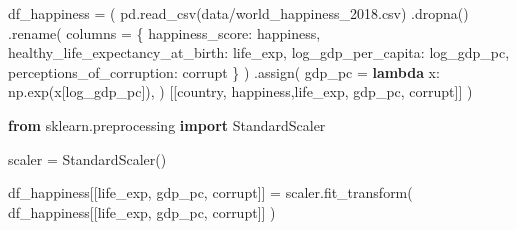 \documentclass[
  letterpaper,
]{krantz}
\newenvironment{Shaded}{}{}
\newcommand{\ImportTok}[1]{\textcolor[rgb]{0.00,0.50,0.00}{\textbf{#1}}}
\newcommand{\KeywordTok}[1]{\textcolor[rgb]{0.00,0.44,0.13}{\textbf{#1}}}
\newcommand{\NormalTok}[1]{#1}
\newcommand{\OperatorTok}[1]{\textcolor[rgb]{0.40,0.40,0.40}{#1}}
\newcommand{\StringTok}[1]{\textcolor[rgb]{0.25,0.44,0.63}{#1}}
\begin{document}
\begin{Shaded}
\begin{Highlighting}[]
\NormalTok{df\_happiness }\OperatorTok{=}\NormalTok{ (}
\NormalTok{    pd.read\_csv(}\StringTok{\textquotesingle{}data/world\_happiness\_2018.csv\textquotesingle{}}\NormalTok{)}
\NormalTok{    .dropna()}
\NormalTok{    .rename(}
\NormalTok{        columns }\OperatorTok{=}\NormalTok{ \{}
            \StringTok{\textquotesingle{}happiness\_score\textquotesingle{}}\NormalTok{: }\StringTok{\textquotesingle{}happiness\textquotesingle{}}\NormalTok{,}
            \StringTok{\textquotesingle{}healthy\_life\_expectancy\_at\_birth\textquotesingle{}}\NormalTok{: }\StringTok{\textquotesingle{}life\_exp\textquotesingle{}}\NormalTok{,}
            \StringTok{\textquotesingle{}log\_gdp\_per\_capita\textquotesingle{}}\NormalTok{: }\StringTok{\textquotesingle{}log\_gdp\_pc\textquotesingle{}}\NormalTok{,}
            \StringTok{\textquotesingle{}perceptions\_of\_corruption\textquotesingle{}}\NormalTok{: }\StringTok{\textquotesingle{}corrupt\textquotesingle{}}
\NormalTok{        \}}
\NormalTok{    )}
\NormalTok{    .assign(}
\NormalTok{        gdp\_pc }\OperatorTok{=} \KeywordTok{lambda}\NormalTok{ x: np.exp(x[}\StringTok{\textquotesingle{}log\_gdp\_pc\textquotesingle{}}\NormalTok{]),}
\NormalTok{    )    }
\NormalTok{    [[}\StringTok{\textquotesingle{}country\textquotesingle{}}\NormalTok{, }\StringTok{\textquotesingle{}happiness\textquotesingle{}}\NormalTok{,}\StringTok{\textquotesingle{}life\_exp\textquotesingle{}}\NormalTok{, }\StringTok{\textquotesingle{}gdp\_pc\textquotesingle{}}\NormalTok{, }\StringTok{\textquotesingle{}corrupt\textquotesingle{}}\NormalTok{]]}
\NormalTok{)}


\ImportTok{from}\NormalTok{ sklearn.preprocessing }\ImportTok{import}\NormalTok{ StandardScaler}

\NormalTok{scaler }\OperatorTok{=}\NormalTok{ StandardScaler()}

\NormalTok{df\_happiness[[}\StringTok{\textquotesingle{}life\_exp\textquotesingle{}}\NormalTok{, }\StringTok{\textquotesingle{}gdp\_pc\textquotesingle{}}\NormalTok{, }\StringTok{\textquotesingle{}corrupt\textquotesingle{}}\NormalTok{]] }\OperatorTok{=}\NormalTok{ scaler.fit\_transform(}
\NormalTok{    df\_happiness[[}\StringTok{\textquotesingle{}life\_exp\textquotesingle{}}\NormalTok{, }\StringTok{\textquotesingle{}gdp\_pc\textquotesingle{}}\NormalTok{, }\StringTok{\textquotesingle{}corrupt\textquotesingle{}}\NormalTok{]]}
\NormalTok{)}
\end{Highlighting}
\end{Shaded}
\end{document}
